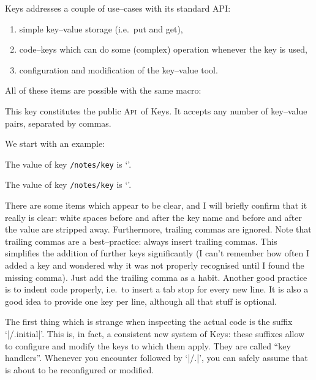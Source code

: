 \documentclass[a4paper]{ltxdoc}
\def\API{\textsc{Api}}%
\begin{document}
\PGF Keys addresses a couple of use--cases with its standard API:
\begin{enumerate}
	\item simple key--value storage (i.e.\ put and get),
	\item code--keys which can do some (complex) operation whenever the key is used,
	\item configuration and modification of the key--value tool.
\end{enumerate}
All of these items are possible with the same macro:

\begin{command}{\pgfkeys{}}
	This key constitutes the public \API\ of \PGF Keys. It accepts any number of key--value pairs, separated by commas.
\end{command}

We start with an example:
\begin{codeexample}[]

The value of key \texttt{/notes/key} is `'.


The value of key \texttt{/notes/key} is `'.
\end{codeexample}

There are some items which appear to be clear, and I will briefly confirm that it really is clear: white spaces before and after the key name and before and after the value are stripped away. Furthermore, trailing commas are ignored. Note that trailing commas are a best--practice: always insert trailing commas. This simplifies the addition of further keys significantly (I can't remember how often I added a key and wondered why it was not properly recognised until I found the missing comma). Just add the trailing comma as a habit. Another good practice is to indent code properly, i.e.\ to insert a tab stop for every new line. It is also a good idea to provide one key per line, although all that stuff is optional.

The first thing which is strange when inspecting the actual code is the suffix `|/.initial|'. This is, in fact, a consistent new system of \PGF Keys: these suffixes allow to configure and modify the keys to which them apply. They are called ``key handlers''. Whenever you encounter  followed by `|/.|', you can safely assume that  is about to be reconfigured or modified.
\end{document}
